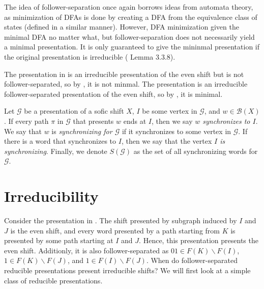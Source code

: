 \documentclass[hidelinks]{report}
\newcommand{\Gc}{\mathcal{G}}  %
\newcommand{\Bc}{\mathcal{B}}
\newcommand{\term}[1]{\textit{#1}}
\theoremstyle{definition}
\begin{document}
The idea of follower-separation once again borrows ideas from automata theory,
 as minimization of DFAs is done by creating a DFA from the equivalence class of states 
(defined in a similar manner). However, DFA minimization given the minimal 
DFA no matter what, but follower-separation does not necessarily yield a minimal 
presentation. It is only guaranteed to give the mininmal presentation if the 
original presentation is irreducible (\cite{lind1995introduction} Lemma 3.3.8).

\begin{example}
    The presentation in  is an irreducible presentation 
    of the even shift but is not follower-separated, so by ,
    it is not minmal. The presentation  is an irreducible 
    follower-separated presentation of the even shift, so by ,
    it is minimal.
\end{example}

\begin{definition}
    Let \(\Gc\) be a presentation of a sofic shift \(X\), \(I\) be some vertex in \(\Gc\), and \(w \in \Bc(X)\).
    If every path \(\pi\) in \(\Gc\) that presents \(w\) ends at \(I\), then we say \term{\(w\) synchronizes to \(I\)}.
    We say that \(w\) is \term{synchronizing for \(\Gc\)} if it synchronizes to some vertex in \(\Gc\). 
    If there is a word that synchronizes to \(I\), then we say that the vertex \term{\(I\) is synchronizing}.
    Finally, we denote 
    \(S(\Gc)\) as the set of all synchronizing words for \(\Gc\).
\end{definition}



\chapter{Irreducibility}

Consider the presentation in .
The shift presented by subgraph induced by \(I\) and \(J\) is the even shift, and every 
word presented by a path starting from \(K\) is presented by some path starting at 
\(I\) and \(J\). Hence, this presentation presents the even shift. Additionly, it is 
also follower-separated as \(01 \in F(K)\backslash F(I)\), \(1 \in F(K)\backslash F(J)\),
and \(1 \in F(I) \backslash F(J)\). 
When do follower-separated reducible presentations present irreducible shifts? We will first look 
at a simple class of reducible presentations.
\end{document}
